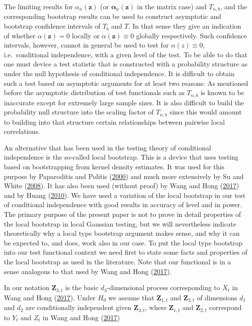 \documentclass[
  12pt,
  letterpaper]{article}
\numberwithin{equation}{section}
\newcommand{\Z}{\bm{Z}}
\newcommand{\z}{\bm{z}}
\newcommand{\falpha}{\bm{\alpha}}
\begin{document}
The limiting results for \(\alpha_n(\z)\) (or \({\falpha_n}(\z)\) in the matrix case) and \(T_{n,b}\), and the corresponding bootstrap results can be used to construct asymptotic and bootstrap confidence intervals of \(T_b\) and \(T\). In that sense they give an indication of whether \(\alpha(\z) = 0\) locally or \(\alpha(\z) \equiv 0\) globally respectively. Such confidence intervals, however, cannot in general be used to test for \(\alpha(z) \equiv 0\), i.e.~conditional independence, with a given level of the test. To be able to do that one must device a test statistic that is constructed with a probability structure as under the null hypothesis of conditional independence. It is difficult to obtain such a test based on asymptotic arguments for at least two reasons: As mentioned before the asymptotic distribution of test functionals such as \(T_{n,b}\) is known to be inaccurate except for extremely large sample sizes. It is also difficult to build the probability null structure into the scaling factor of \(T_{n,b}\) since this would amount to building into that structure certain relationships between pairwise local correlations.

An alternative that has been used in the testing theory of conditional independence is the so-called local bootstrap. This is a device that uses testing based on bootstrapping from kernel density estimates. It was used for this purpose by Paparoditis and Politis (\protect\hyperlink{ref-paparoditis2000local}{2000}) and much more extensively by Su and White (\protect\hyperlink{ref-su2008nonparametric}{2008}). It has also been used (without proof) by Wang and Hong (\protect\hyperlink{ref-wang2017characteristic}{2017}) and by Huang (\protect\hyperlink{ref-huang2010testing}{2010}). We have used a variation of the local bootstrap in our test of conditional independence with good results in accuracy of level and in power. The primary purpose of the present paper is not to prove in detail properties of the local bootstrap in local Gaussian testing, but we will nevertheless indicate theoretically why a local type bootstrap argument makes sense, and why it can be expected to, and does, work also in our case. To put the local type bootstrap into our test functional context we need first to state some facts and properties of the local bootstrap as used in the literature. Note that our functional is in a sense analogous to that used by Wang and Hong (\protect\hyperlink{ref-wang2017characteristic}{2017}).

In our notation \(\Z_{3,t}\) is the basic \(d_3\)-dimensional process corresponding to \(X_t\) in Wang and Hong (\protect\hyperlink{ref-wang2017characteristic}{2017}). Under \(H_0\) we assume that \(\Z_{1,t}\) and \(\Z_{2,t}\) of dimensions \(d_1\) and \(d_2\) are conditionally independent given \(\Z_{3,t}\), where \(\Z_{1,t}\) and \(\Z_{2,t}\) correspond to \(Y_t\) and \(Z_t\) in Wang and Hong (\protect\hyperlink{ref-wang2017characteristic}{2017})
\end{document}
